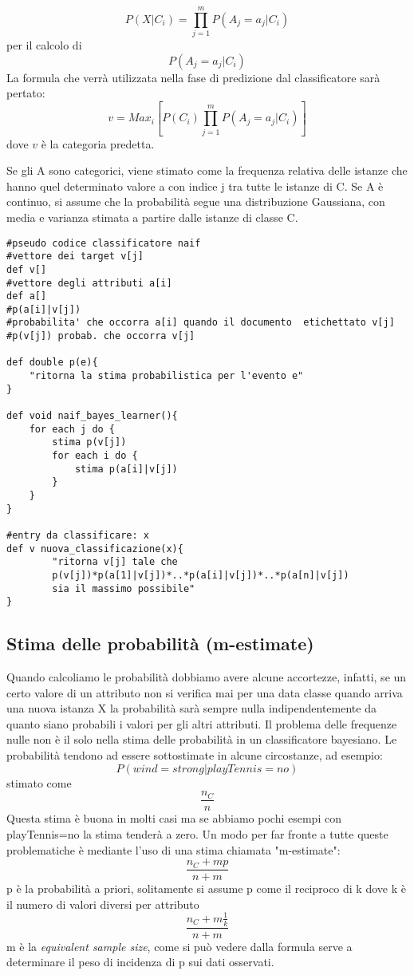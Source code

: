 \documentclass{article}
\theoremstyle{plain}
\theoremstyle{definition}
\begin{document}
$$P(X|C_i)=\prod_{j=1}^m P(A_j=a_j|C_i)$$
per il calcolo di 
$$P(A_j=a_j|C_i)$$
La formula che verrà utilizzata nella fase di predizione dal classificatore sarà pertato:
$$v=Max_i [P(C_i)\prod_{j=1}^m P(A_j=a_j|C_i)]$$
dove $v$ è la categoria predetta.

Se gli A sono categorici, viene stimato come la frequenza relativa delle istanze che hanno quel determinato valore a con indice j tra tutte le istanze di C.
Se A è continuo, si assume che la probabilità segue una distribuzione Gaussiana, con media e varianza stimata a partire dalle istanze di classe C.

\begin{lstlisting}
#pseudo codice classificatore naif
#vettore dei target v[j]
def v[]
#vettore degli attributi a[i]
def a[]
#p(a[i]|v[j]) 
#probabilita' che occorra a[i] quando il documento  etichettato v[j]
#p(v[j]) probab. che occorra v[j]

def double p(e){
	"ritorna la stima probabilistica per l'evento e"
}

def void naif_bayes_learner(){
	for each j do {
		stima p(v[j])
		for each i do {
			stima p(a[i]|v[j])
		}
	}
}

#entry da classificare: x
def v nuova_classificazione(x){
		"ritorna v[j] tale che
		p(v[j])*p(a[1]|v[j])*..*p(a[i]|v[j])*..*p(a[n]|v[j])
		sia il massimo possibile"
}
\end{lstlisting}


\subsection{Stima delle probabilità (m-estimate)}
Quando calcoliamo le probabilità dobbiamo avere alcune accortezze, infatti, se un certo valore di un attributo non si verifica mai per una data classe quando arriva una nuova istanza X la probabilità sarà sempre nulla indipendentemente da quanto siano probabili i valori per gli altri attributi. Il problema delle frequenze nulle non è il solo nella stima delle probabilità in un classificatore bayesiano. Le probabilità tendono ad essere sottostimate in alcune circostanze, ad esempio:
$$P(wind=strong|playTennis=no)$$ stimato come $$\frac{n_C}{n}$$
Questa stima è buona in molti casi ma se abbiamo pochi esempi con playTennis=no la stima tenderà a zero.
Un modo per far fronte a tutte queste problematiche è mediante l'uso di una stima chiamata "m-estimate":
$$\frac{n_C+mp}{n+m}$$
p è la probabilità a priori, solitamente si assume p come il reciproco di k dove k è il numero di valori diversi per attributo
$$\frac{n_C+m\frac{1}{k}}{n+m}$$
m è la \textit{equivalent sample size}, come si può vedere dalla formula serve a determinare il peso di incidenza di p sui dati osservati. 
\end{document}
